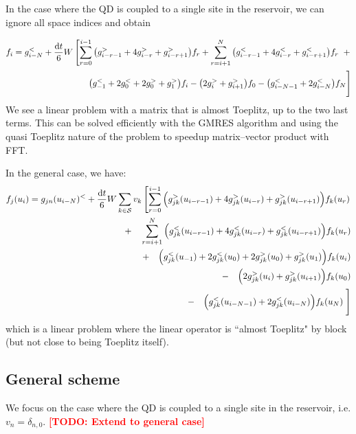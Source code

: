 \documentclass[12pt]{article}
\newcommand\TODO[1]{\textcolor{red}{\textbf{[TODO: #1]}}}
\begin{document}
In the case where the \ac{QD} is coupled to a single site in the reservoir, we can ignore all space indices and obtain

\begin{equation}
	\begin{split}
	f_i = g_{i - N}^< + \frac{\dd{t}}{6} W \left[
	 \sum_{r=0}^{i-1} \qty(g^>_{i-r-1} + 4 g^>_{i - r} + g^>_{i-r + 1}) f_{r} +
	 \sum_{r=i+1}^{N} \qty(g^<_{i-r-1} + 4 g^<_{i - r} + g^<_{i-r+1}) f_{r} \;\; + \right.
	 \\
	 \left. \qty(g^<_{-1} + 2 g^<_{0} + 2 g^>_{0} + g^>_{1}) f_{i}
	 - \qty(2 g^>_{i} + g^>_{i + 1}) f_{0}
	 - \qty(g^<_{i-N-1} + 2 g^<_{i-N}) f_N
	 \vphantom{\sum_{i=0}^N}\right]
	 \end{split}
\end{equation}
We see a linear problem with a matrix that is almost Toeplitz, up to the two last terms. This can be solved efficiently with the GMRES algorithm and using the quasi Toeplitz nature of the problem to speedup matrix--vector product with FFT.

In the general case, we have:
\begin{equation}
	\begin{split}
		f_{j}(u_i) = g_{jn}(u_{i-N})^< + \frac{\dd{t}}{6} W \sum_{k \in \mathcal{S}} v_k \left[
		\sum_{r=0}^{i-1} \qty(g^>_{jk}(u_{i-r-1}) + 4 g^>_{jk}(u_{i-r}) + g^>_{jk}(u_{i-r+1})) f_{k}(u_r) \right.
		\\
		+ \quad \sum_{r=i+1}^{N} \qty(g^<_{jk}(u_{i-r-1}) + 4 g^<_{jk}(u_{i-r}) + g^<_{jk}(u_{i-r+1})) f_{k}(u_r)
		\\
		+ \quad \qty(g^<_{jk}(u_{-1}) + 2 g^<_{jk}(u_0) + 2 g^>_{jk}(u_0) + g^>_{jk}(u_1)) f_{k}(u_i)
		\\
		-\quad \qty(2 g^>_{jk}(u_i) + g^>_{jk}(u_{i+1})) f_{k}(u_0)
		\\
		-\quad \qty(g^<_{jk}(u_{i-N-1}) + 2 g^<_{jk}(u_{i-N})) f_{k}(u_{N})
		\left. \vphantom{\sum_{i=0}^N}\right]
	\end{split}
\end{equation}
which is a linear problem where the linear operator is ``almost Toeplitz" by block (but not close to being Toeplitz itself).

\subsection{General scheme}

We focus on the case where the \ac{QD} is coupled to a single site in the reservoir, i.e. $v_n = \delta_{n,0}$.
\TODO{Extend to general case}
\end{document}

